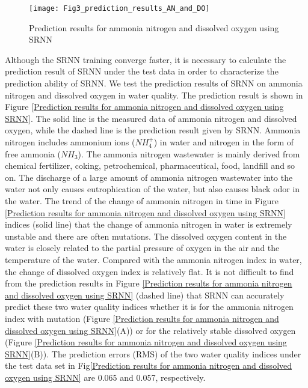 \documentclass[runningheads]{llncs}
\begin{document}
\begin{figure}[htbp]
\centering
\texttt{[image: Fig3\_prediction\_results\_AN\_and\_DO]}
\caption{Prediction results for ammonia nitrogen and dissolved oxygen using SRNN}
\label{Prediction results for ammonia nitrogen and dissolved oxygen using SRNN}
\end{figure}

Although the SRNN training converge faster, it is necessary to 
calculate the prediction result of SRNN under the test data in 
order to characterize the prediction ability of SRNN. 
We test the prediction results of SRNN on 
ammonia nitrogen and dissolved oxygen in water quality. 
The prediction result is shown in Figure \ref{Prediction results for ammonia nitrogen
and dissolved oxygen using SRNN}. The solid line 
is the measured data of ammonia nitrogen and dissolved oxygen, 
while the dashed line is the prediction result given by SRNN. 
Ammonia nitrogen includes ammonium ions ($NH_4^+$) in water and nitrogen in the 
form of free ammonia ($NH_3$). The ammonia nitrogen 
wastewater is mainly derived from chemical fertilizer, coking, 
petrochemical, pharmaceutical, food, landfill and so on. 
The discharge of a large amount of ammonia nitrogen wastewater 
into the water not only causes eutrophication of the water, 
but also causes black odor in the water.
The trend of the change of ammonia nitrogen in time in Figure \ref{Prediction results for ammonia nitrogen
and dissolved oxygen using SRNN} 
indices (solid line) that the change of ammonia nitrogen in water 
is extremely unstable and there are often mutations. 
The dissolved oxygen content in the water is closely related to
the partial pressure of oxygen in the air and the 
temperature of the water. Compared with the ammonia nitrogen 
index in water, the change of dissolved oxygen index 
is relatively flat. It is not difficult to find from the prediction 
results in Figure \ref{Prediction results for ammonia nitrogen
and dissolved oxygen using SRNN} 
(dashed line) that SRNN can accurately predict 
these two water quality indices whether it is for the 
ammonia nitrogen index with mutation (Figure \ref{Prediction results for ammonia nitrogen
and dissolved oxygen using SRNN}(A)) or 
for the relatively stable dissolved oxygen 
(Figure \ref{Prediction results for ammonia nitrogen
and dissolved oxygen using SRNN}(B)). 
The prediction errors (RMS) of the two water quality indices under the test data set 
in Fig\ref{Prediction results for ammonia nitrogen
and dissolved oxygen using SRNN} are 0.065 and 0.057, respectively.
\end{document}

